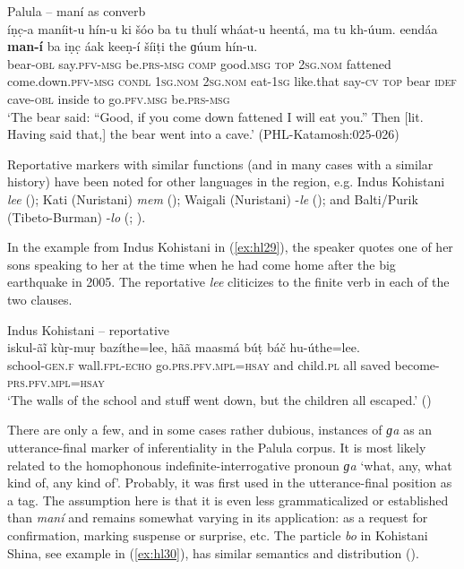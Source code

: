 \documentclass[output=paper]{langsci/langscibook}
\begin{document}
\begin{exe}
\ex Palula -- maní as converb \label{ex:hl28}\\
	\gll íṇc̣-a maníit-u hín-u ki  šóo ba tu thulí wháat-u heentá, ma tu kh-úum. eendáa \textbf{man-í} ba iṇc̣ áak keeṇ-í šíiṭi the ɡúum hín-u.\\
	bear-\textsc{obl} say.\textsc{pfv}-\textsc{msg} be.\textsc{prs}-\textsc{msg} \textsc{comp} good.\textsc{msg} \textsc{top} 2\textsc{sg}.\textsc{nom} fattened come.down.\textsc{pfv}-\textsc{msg} \textsc{condl} 1\textsc{sg}.\textsc{nom} 2\textsc{sg}.\textsc{nom} eat-1\textsc{sg} like.that say-\textsc{cv} \textsc{top} bear \textsc{idef} cave-\textsc{obl} inside to go.\textsc{pfv}.\textsc{msg} be.\textsc{prs}-\textsc{msg}\\
	\trans ‘The bear said: “Good, if you come down fattened I will eat you.” Then [lit. Having said that,] the bear went into a cave.’ (PHL-Katamosh:025-026) 
\end{exe}

Reportative markers with similar functions (and in many cases with a similar history) have been noted for other languages in the region, e.g. Indus Kohistani \textit{lee} (\citealt[22--23]{Lubberger2014}); Kati (Nuristani) \textit{mem} (\citealt{Strand2016}); Waigali (Nuristani) -\textit{le} (\citealt[173–182]{Degener1998}); and Balti/Purik (Tibeto-Burman) -\textit{lo} (\citealt[57--62]{Jones2009b}; \citealt[776--792]{Zemp2013}).

In the example from Indus Kohistani in ‎(\ref{ex:hl29}), the speaker quotes one of her sons speaking to her at the time when he had come home after the big earthquake in 2005. The reportative \textit{lee} cliticizes to the finite verb in each of the two clauses.

\begin{exe}
\ex Indus Kohistani -- reportative \label{ex:hl29}\\
	\gll iskul-ãĩ kùṛ-muṛ bazíthe=lee, hãã maasmá búṭ báč hu-úthe=lee.\\
	school-\textsc{gen}.\textsc{f} wall.\textsc{fpl}-\textsc{echo} go.\textsc{prs}.\textsc{pfv}.\textsc{mpl}=\textsc{hsay} and child.\textsc{pl} all saved become-\textsc{prs}.\textsc{pfv}.\textsc{mpl}=\textsc{hsay}\\
	\trans ‘The walls of the school and stuff went down, but the children all escaped.’ (\citealt[26--27]{Lubberger2014})
\end{exe}

There are only a few, and in some cases rather dubious, instances of \textit{ɡa} as an utterance-final marker of inferentiality in the Palula corpus. It is most likely related to the homophonous indefinite-interrogative pronoun \textit{ɡa} ‘what, any, what kind of, any kind of’. Probably, it was first used in the utterance-final position as a tag. The assumption here is that it is even less grammaticalized or established than \textit{maní} and remains somewhat varying in its application: as a request for confirmation, marking suspense or surprise, etc. The particle \textit{bo} in Kohistani Shina, see example in ‎(\ref{ex:hl30}), has similar semantics and distribution (\citealt[204]{SchmidtKohistani2008}).
\end{document}
